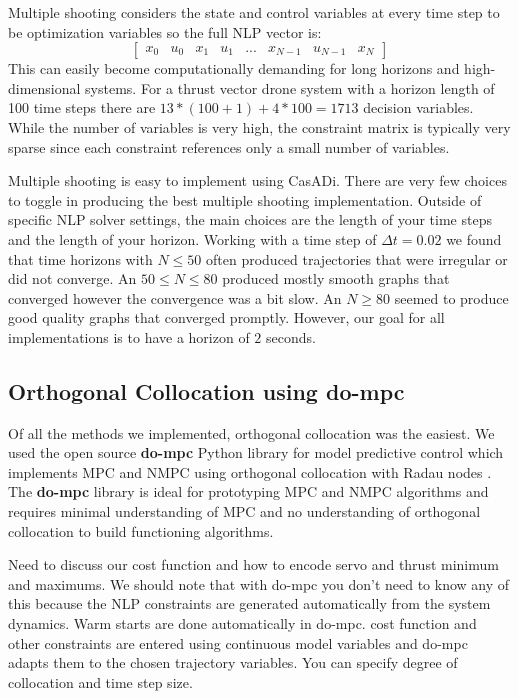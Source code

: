 \documentclass[]{article}
\newcommand{\casadi}{CasADi}
\begin{document}
	Multiple shooting considers the state and control variables at every time step to be optimization variables so the full NLP vector is:
        \[
        \begin{bmatrix}
        x_0 & u_0 & x_1 & u_1 & ... & x_{N-1} & u_{N-1} & x_N
        \end{bmatrix}
        \]
	This can easily become computationally demanding for long horizons and high-dimensional systems. For a thrust vector drone system with a  horizon length of 100 time steps there are $13 * (100+1)+4*100=1713$ decision variables. While the number of variables is very high, the constraint matrix is typically very sparse since each constraint references only a small number of variables.

	Multiple shooting is easy to implement using {\casadi}.  There are very few choices to toggle in producing the best multiple shooting implementation. Outside of specific NLP solver settings, the main choices are the length of your time steps and the length of your horizon.   Working with a time step of $\Delta t = 0.02$ we found that time horizons with $N \leq 50$  often produced trajectories that were irregular or did not converge. An $50 \leq N \leq 80$ produced mostly smooth graphs that converged however the convergence was a bit slow.  An $N \geq 80$ seemed to produce good quality graphs that converged promptly. However, our goal for all implementations is to have a horizon of $2$ seconds. 
	

	

\subsection*{Orthogonal Collocation using {do-mpc}} 
Of all the methods we implemented, orthogonal collocation was the easiest. We used the open source {\bf do-mpc} Python library for model predictive control  \citep{do-mpc}   which implements MPC and NMPC using orthogonal collocation with Radau nodes \citep{dompc-oc}.
The {\bf do-mpc} library is ideal for prototyping  MPC and NMPC algorithms and requires minimal understanding of MPC and no understanding of orthogonal collocation to build functioning algorithms.

Need to discuss our cost function and how to encode servo and thrust minimum and maximums.  We should note that with do-mpc you don't need to know any of this because the NLP constraints are generated automatically from the system dynamics. Warm starts are done automatically in do-mpc. cost function and other constraints are entered using continuous model variables and do-mpc adapts them to the chosen trajectory variables. You can specify degree of collocation and time step size.
\end{document}
